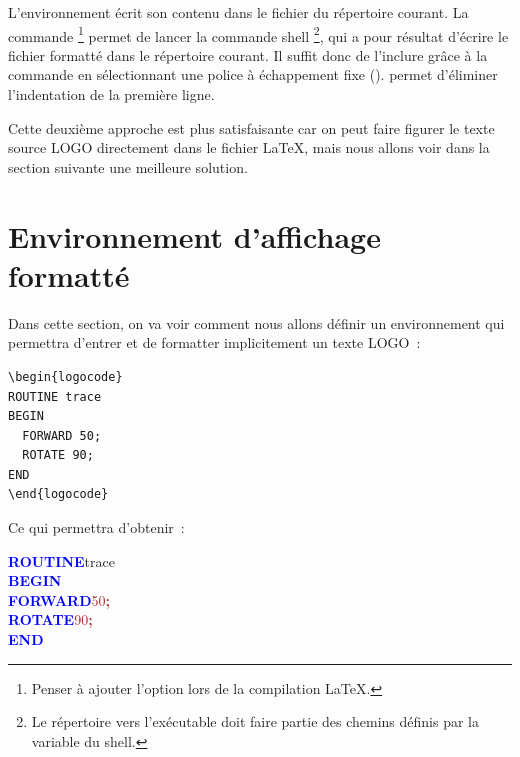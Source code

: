L'environnement  écrit son contenu dans le fichier  du répertoire courant. La commande \footnote{Penser à ajouter l'option  lors de la compilation \LaTeX.} permet de lancer la commande shell \footnote{Le répertoire vers l'exécutable  doit faire partie des chemins définis par la variable  du shell.}, qui a pour résultat d'écrire le fichier formatté  dans le répertoire courant. Il suffit donc de l'inclure grâce à la commande  en sélectionnant une police à échappement fixe ().  permet d'éliminer l'indentation de la première ligne.

Cette deuxième approche est plus satisfaisante car on peut faire figurer le texte source LOGO directement dans le fichier \LaTeX, mais nous allons voir dans la section suivante une meilleure solution.











\section{Environnement d'affichage formatté}

Dans cette section, on va voir comment nous allons définir un environnement  qui permettra d'entrer et de formatter implicitement un texte LOGO~:

\begin{verbatim}
\begin{logocode}
ROUTINE trace
BEGIN
  FORWARD 50;
  ROTATE 90;
END
\end{logocode}
\end{verbatim}

Ce qui permettra d'obtenir~:

{\noindent\ttfamily
\textcolor{blue}{\bf ROUTINE}\hspace*{.6em}t{}r{}a{}c{}e{} \\
\textcolor{blue}{\bf BEGIN} \\
\hspace*{1.2em}\textcolor{blue}{\bf FORWARD}\hspace*{.6em}\textcolor{brown}{5{}0{}}\textcolor{brown}{\bf ;} \\
\hspace*{1.2em}\textcolor{blue}{\bf ROTATE}\hspace*{.6em}\textcolor{brown}{9{}0{}}\textcolor{brown}{\bf ;} \\
\textcolor{blue}{\bf END}
}


